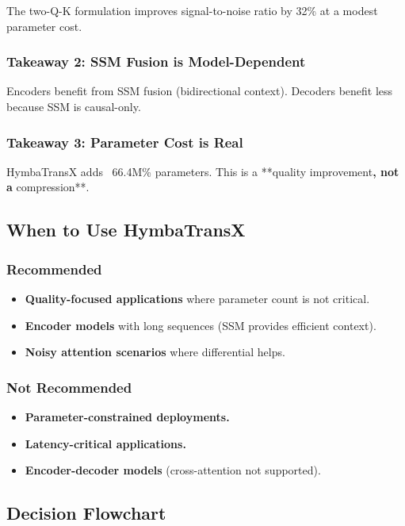 The two-Q-K formulation improves signal-to-noise ratio by 
32\% at a modest parameter cost.

\subsubsection{Takeaway 2: SSM Fusion is Model-Dependent}

Encoders benefit from SSM fusion (bidirectional context). Decoders benefit 
less because SSM is causal-only.

\subsubsection{Takeaway 3: Parameter Cost is Real}

HymbaTransX adds ~66.4M\% parameters. This is a **quality 
improvement\textbf{, not a }compression**.

\subsection{When to Use HymbaTransX}

\subsubsection{Recommended}
\begin{itemize}
\item \textbf{Quality-focused applications} where parameter count is not critical.
\item \textbf{Encoder models} with long sequences (SSM provides efficient context).
\item \textbf{Noisy attention scenarios} where differential helps.

\end{itemize}
\subsubsection{Not Recommended}
\begin{itemize}
\item \textbf{Parameter-constrained deployments.}
\item \textbf{Latency-critical applications.}
\item \textbf{Encoder-decoder models} (cross-attention not supported).

\end{itemize}
\subsection{Decision Flowchart}

